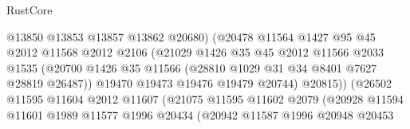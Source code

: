 \begin{lexlean}{RustCore}
\begin{coremodule}
                                        @13850
                                        @13853
                                        @13857
                                        @13862
                                        @20680)
                                      (@20478
                                        @11564
                                        @1427
                                        @95
                                        @45
                                        @2012
                                        @11568
                                        @2012
                                        @2106
                                        (@21029
                                          @1426
                                          @35
                                          @45
                                          @2012
                                          @11566
                                          @2033
                                          @1535
                                          (@20700
                                            @1426
                                            @35
                                            @11566
                                            (@28810 @1029 @31 @34 @8401 @7627 @28819 @26487))
                                          @19470
                                          @19473
                                          @19476
                                          @19479
                                          @20744)
                                        @20815))
                                    (@26502
                                      @11595
                                      @11604
                                      @2012
                                      @11607
                                      (@21075
                                        @11595
                                        @11602
                                        @2079
                                        (@20928
                                          @11594
                                          @11601
                                          @1989
                                          @11577
                                          @1996
                                          @20434
                                          (@20942
                                            @11587
                                            @1996
                                            @20948
                                            @20453

\end{coremodule}
\end{lexlean}
